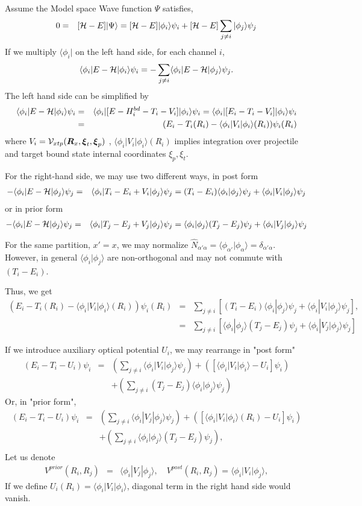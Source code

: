 \documentclass[11pt]{book}
\def\bm{\boldsymbol}
\def\la{\langle}
\def\ra{\rangle}
\newcommand{\bea}{\begin{eqnarray}}
\newcommand{\eea}{\end{eqnarray}}
\newcommand{\no}{\nonumber \\}
\begin{document}
Assume the Model space Wave function $\Psi$ satisfies,
\bea 
0&=&[{\cal H}-E]|\Psi\ra 
  =[{\cal H}-E]|\phi_i\ra \psi_i +
    [{\cal H}-E]\sum_{j\neq i}|\phi_j\ra \psi_j
\eea 
If we multiply $\la \phi_i|$ on the left hand side, for each channel $i$, 
\bea 
\la \phi_i|E-{\cal H}|\phi_i\ra \psi_i
= -\sum_{j\neq i}\la \phi_i|E-{\cal H}|\phi_j\ra \psi_j.
\eea 
The left hand side can be simplified by
\bea 
\la \phi_i|E-{\cal H}|\phi_i\ra \psi_i
&=&\la \phi_i|[E-H_i^{bd}-T_i-V_i]|\phi_i\ra \psi_i
=\la \phi_i|[E_i-T_i-V_i]|\phi_i\ra \psi_i \no 
&=&(E_i-T_i(R_i)-\la\phi_i|V_i|\phi_i\ra(R_i))\psi_i(R_i)
\eea 
where $V_i={\cal V}_{xtp}({\bm R}_x,{\bm \xi}_t,{\bm \xi}_p)$ ,
$\la\phi_i|V_i|\phi_i\ra(R_i)$ implies integration over projectile and target bound state internal coordinates $\xi_p,\xi_t$.

For the right-hand side, we may use two different ways, in post form
\bea
-\la \phi_i|E-{\cal H}|\phi_j\ra \psi_j
&=& \la \phi_i|T_i-E_i+V_i|\phi_j\ra \psi_j 
   = (T_i-E_i) \la \phi_i|\phi_j\ra\psi_j
     +\la \phi_i|V_i|\phi_j\ra \psi_j  
\eea 
or in prior form
\bea 
-\la \phi_i|E-{\cal H}|\phi_j\ra \psi_j
&=& \la \phi_i|T_j-E_j+V_j|\phi_j\ra \psi_j 
   =  \la \phi_i|\phi_j\ra (T_j-E_j)\psi_j
     +\la \phi_i|V_j|\phi_j\ra \psi_j  
\eea 

For the same partition, $x'=x$, we may normalize 
$\hat{N}_{\alpha'\alpha}=\la \phi_{\alpha'}|\phi_{\alpha}\ra=\delta_{\alpha'\alpha}$.
However, in general $\la \phi_i|\phi_j\ra$ are non-orthogonal and may not commute with  $(T_i-E_i)$.

Thus, we get 
\bea 
(E_i-T_i(R_i)-\la\phi_i|V_i|\phi_i\ra(R_i))\psi_i(R_i)
&=&\sum_{j\neq i}\left[ (T_i-E_i) \la \phi_i|\phi_j\ra\psi_j
     +\la \phi_i|V_i|\phi_j\ra \psi_j \right] ,\no 
&=&\sum_{j\neq i} \left[ \la \phi_i|\phi_j\ra (T_j-E_j)\psi_j
     +\la \phi_i|V_j|\phi_j\ra \psi_j\right]       
\eea 

If we introduce auxiliary optical potential $U_i$, we may rearrange in "post form"
\bea 
(E_i-T_i-U_i)\psi_i
&=& \left( \sum_{j\neq i} \la \phi_i|V_i|\phi_j\ra \psi_j \right)
   +\left( [\la\phi_i|V_i|\phi_i\ra-U_i]\psi_i \right) \no & &
   +\left( \sum_{j\neq i}  (T_j-E_j)\la \phi_i|\phi_j\ra \psi_j \right)
\eea 
Or, in "prior form",
\bea     
(E_i-T_i-U_i)\psi_i
&=& \left( \sum_{j\neq i} \la \phi_i|V_j|\phi_j\ra \psi_j \right)
   +\left( [\la\phi_i|V_i|\phi_i\ra(R_i)-U_i]\psi_i \right) 
   \no & & 
   +\left( \sum_{j\neq i}  \la \phi_i|\phi_j\ra  (T_j-E_j)\psi_j \right) ,\no   
\eea 
Let us denote 
\bea 
V^{prior}(R_i,R_j)&=&\la \phi_i|V_j|\phi_j\ra,\quad 
V^{post}(R_i,R_j)=\la \phi_i|V_i|\phi_j\ra,
\eea 
If we define $U_i(R_i)=\la \phi_i|V_i|\phi_i\ra$, 
diagonal term in the right hand side would vanish. 
\end{document}
